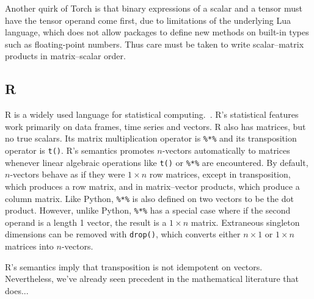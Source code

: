Another quirk of Torch is that binary expressions of a scalar and a tensor must
have the tensor operand come first, due to limitations of the underlying Lua
language, which does not allow packages to define new methods on built-in
types such as floating-point numbers. Thus care must be taken to write
scalar--matrix products in matrix--scalar order.


\subsection{R}

R is a widely used language for statistical computing.~\cite{Rlang}.
R's statistical features work primarily on data frames, time series and vectors.
R also has matrices, but no true scalars.
Its matrix multiplication operator is \verb`%*%` and its transposition operator
is \verb`t()`.
R's semantics promotes $n$-vectors automatically to matrices whenever linear algebraic
operations like \verb`t()` or \verb`%*%` are encountered.
By default, $n$-vectors behave as if they were $1\times n$ row matrices, except in
transposition, which produces a row matrix, and in matrix--vector products, which
produce a column matrix.
Like Python, \verb`%*%` is also defined on two vectors to be the dot product.
However, unlike Python, \verb`%*%` has a special case where if the second operand
is a length 1 vector, the result is a $1\times n$ matrix.
Extraneous singleton dimensions can be removed with \verb`drop()`, which converts
either $n\times1$ or $1\times n$ matrices into $n$-vectors.

R's semantics imply that transposition is not idempotent on vectors.
Nevertheless, we've already seen precedent in the mathematical literature
that does...
